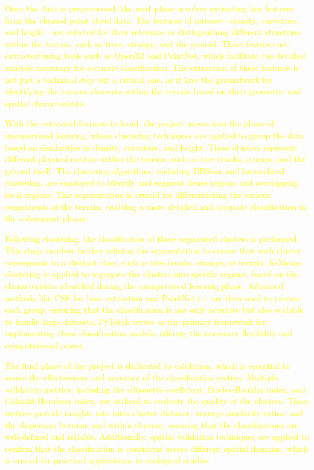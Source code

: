 \documentclass[../report.tex]{subfiles}
\begin{document}
{\textcolor{yellow}{Once the data is preprocessed, the next phase involves extracting key features from the cleaned point cloud data. The features of interest—density, curvature, and height—are selected for their relevance in distinguishing different structures within the terrain, such as trees, stumps, and the ground. These features are extracted using tools such as Open3D and PointNet, which facilitate the detailed analysis necessary for accurate classification. The extraction of these features is not just a technical step but a critical one, as it lays the groundwork for identifying the various elements within the terrain based on their geometric and spatial characteristics.}

\textcolor{yellow}{With the extracted features in hand, the project moves into the phase of unsupervised learning, where clustering techniques are applied to group the data based on similarities in density, curvature, and height. These clusters represent different physical entities within the terrain, such as tree trunks, stumps, and the ground itself. The clustering algorithms, including DBScan and hierarchical clustering, are employed to identify and segment dense regions and overlapping local regions. This segmentation is crucial for differentiating the various components of the terrain, enabling a more detailed and accurate classification in the subsequent phases.

Following clustering, the classification of these segmented clusters is performed. This stage involves further refining the segmentation to ensure that each cluster corresponds to a distinct class, such as tree trunks, stumps, or terrain. K-Means clustering is applied to segregate the clusters into specific regions, based on the characteristics identified during the unsupervised learning phase. Advanced methods like CSF for base extraction and PointNet++ are then used to process each group, ensuring that the classification is not only accurate but also scalable to handle large datasets. PyTorch serves as the primary framework for implementing these classification models, offering the necessary flexibility and computational power.

The final phase of the project is dedicated to validation, which is essential to assess the effectiveness and accuracy of the classification system. Multiple validation metrics, including the silhouette coefficient, Davies-Bouldin index, and Calinski-Harabasz index, are utilized to evaluate the quality of the clusters. These metrics provide insights into intra-cluster distance, average similarity ratios, and the dispersion between and within clusters, ensuring that the classifications are well-defined and reliable. Additionally, spatial validation techniques are applied to confirm that the classification is consistent across different spatial domains, which is crucial for practical applications in ecological studies.}
}
\end{document}
